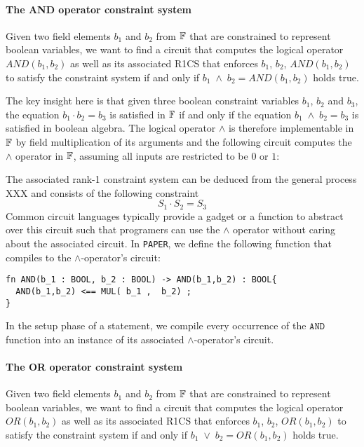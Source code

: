 \paragraph{The AND operator constraint system} Given two field elements $b_1$ and $b_2$ from $\mathbb{F}$ that are constrained to represent boolean variables, we want to find a circuit that computes the logical  operator $AND(b_1,b_2)$ as well as its associated R1CS that enforces $b_1$, $b_2$, $AND(b_1,b_2)$ to satisfy the constraint system if and only if $b_1\; \wedge \; b_2 =AND(b_1,b_2)$ holds true. 

The key insight here is that given three boolean constraint variables $b_1$, $b_2$ and $b_3$, the equation $b_1\cdot b_2 = b_3$ is satisfied in $\mathbb{F}$ if and only if the equation $b_1\; \wedge \; b_2 = b_3$ is satisfied in boolean algebra. The logical operator $\wedge$ is therefore implementable in $\mathbb{F}$ by field multiplication of its arguments and the following circuit computes the $\wedge$ operator in $\mathbb{F}$, assuming all inputs are restricted to be $0$ or $1$:
\begin{center}
\end{center}
The associated rank-1 constraint system can be deduced from the general process XXX and consists of the following constraint
\begin{equation}
 S_1 \cdot S_2 = S_3
\end{equation}
Common circuit languages typically provide a gadget or a function to abstract over this circuit such that programers can use the $\wedge$ operator without caring about the associated circuit. In \texttt{PAPER}, we define the following function that compiles to the $\wedge$-operator's circuit:
\begin{lstlisting}
fn AND(b_1 : BOOL, b_2 : BOOL) -> AND(b_1,b_2) : BOOL{
  AND(b_1,b_2) <== MUL( b_1 ,  b_2) ;
}
\end{lstlisting}
In the setup phase of a statement, we compile every occurrence of the $\mathtt{AND}$ function into an instance of its associated $\wedge$-operator's circuit.
\paragraph{The OR operator constraint system} Given two field elements $b_1$ and $b_2$ from $\mathbb{F}$ that are constrained to represent boolean variables, we want to find a circuit that computes the logical  operator $OR(b_1,b_2)$ as well as its associated R1CS that enforces $b_1$, $b_2$, $OR(b_1,b_2)$ to satisfy the constraint system if and only if $b_1\; \vee \; b_2 = OR(b_1,b_2)$ holds true. 

